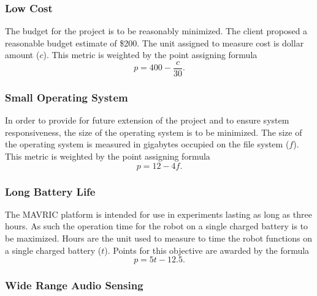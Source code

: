 \documentclass{article}
\begin{document}
        \subsubsection{Low Cost}
            The budget for the project is to be reasonably minimized.
            The client proposed a reasonable budget estimate of \$200.
            The unit  assigned to measure cost is dollar amount ($c$).
            This metric is weighted by the point assigning formula
            \begin{equation} \label{eq:cost}
                p = 400 -\frac{c}{30}.
            \end{equation}

        \subsubsection{Small Operating System}
        
            In order to provide for future extension of the project
            and to ensure system responsiveness,
            the size of the operating system is to be minimized.
            The size of the operating system is measured
            in gigabytes occupied on the file system ($f$).
            This metric is weighted by the point assigning formula
            \begin{equation}
                p = 12 - 4f.
            \end{equation}

        \subsubsection{Long Battery Life}
        
            The MAVRIC platform is intended for use
            in experiments lasting as long as three hours.
            As such the operation time for the robot on a single charged battery
            is to be maximized.
            Hours are the unit used to measure to time
            the robot functions on a single charged battery ($t$).
            Points for this objective are awarded by the formula
            \begin{equation}
                p = 5 t - 12.5.
            \end{equation}

        \subsubsection{Wide Range Audio Sensing}
        
\end{document}
